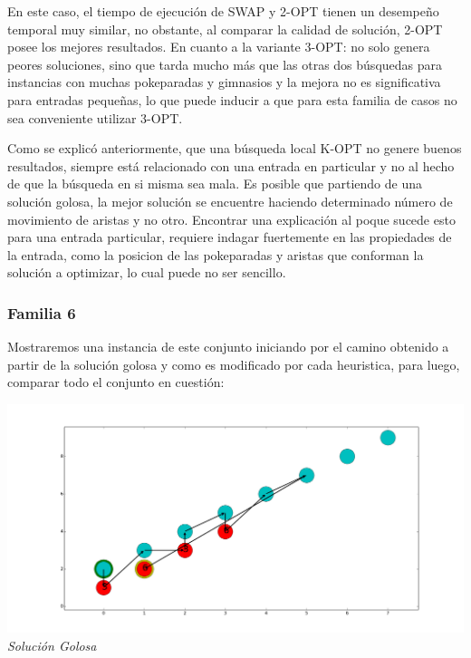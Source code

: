En este caso, el tiempo de ejecuci\'on de SWAP y 2-OPT tienen un desempeño temporal muy similar, no obstante, al comparar la calidad de solución, 2-OPT posee los mejores resultados. En cuanto a la variante 3-OPT: no solo genera peores soluciones, sino que tarda mucho más que las otras dos búsquedas para instancias con muchas pokeparadas y gimnasios y la mejora no es significativa para entradas pequeñas, lo que puede inducir a que para esta familia de casos no sea conveniente utilizar 3-OPT.

Como se explicó anteriormente, que una búsqueda local K-OPT no genere buenos resultados, siempre está relacionado con una entrada en particular y no al hecho de que la búsqueda en si misma sea mala. Es posible que partiendo de una solución golosa, la mejor solución se encuentre haciendo determinado número de movimiento de aristas y no otro. Encontrar una explicación al poque sucede esto para una entrada particular, requiere indagar fuertemente en las propiedades de la entrada, como la posicion de las pokeparadas y aristas que conforman la solución a optimizar, lo cual puede no ser sencillo.\\

\subsubsection*{Familia 6}

Mostraremos una instancia de este conjunto iniciando por el camino obtenido a partir de la soluci\'on golosa y como es modificado por cada heuristica, para luego, comparar todo el conjunto en cuesti\'on:

\vspace*{0.3cm} \vspace*{0.3cm}
  \begin{center}
 \includegraphics[scale=0.3]{./EJ3/sinOrdengoloso.png}\\
 {            \textit{Soluci\'on Golosa}}
  \end{center}
  \vspace*{0.3cm}

